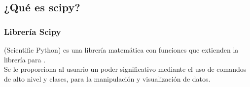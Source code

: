 \subsection{¿Qué es scipy?}
\begin{frame}
\frametitle{Librería Scipy}
 (Scientific Python) es una librería matemática con funciones que extienden la librería  para \python.
\\
\bigskip
Se le proporciona al usuario un poder significativo mediante el uso de comandos de alto nivel y clases, para la manipulación y visualización de datos.
\end{frame}
